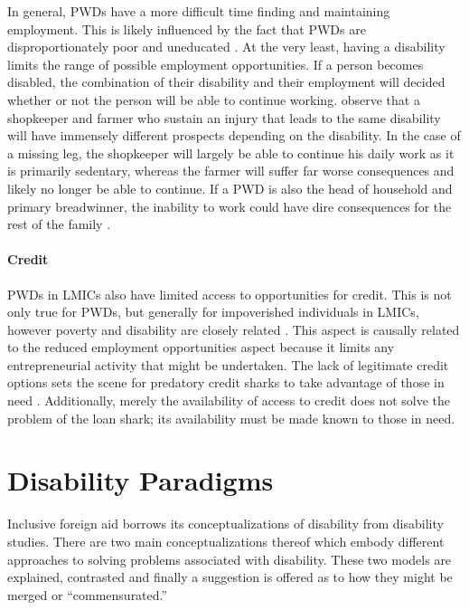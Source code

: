 \documentclass[a4paper]{article}
\begin{document}
In general, PWDs have a more difficult time finding and maintaining
employment. This is likely influenced by the fact that PWDs are
disproportionately poor and uneducated \citep{lamichhane2014nexus}. At the
very least, having a disability limits the range of possible employment
opportunities. If a person becomes disabled, the combination of their
disability and their employment will decided whether or not the person will be
able to continue working. \cite{chowdhury2006economics} observe that a
shopkeeper and farmer who sustain an injury that leads to the same disability
will have immensely different prospects depending on the disability. In the
case of a missing leg, the shopkeeper will largely be able to continue his
daily work as it is primarily sedentary, whereas the farmer will suffer far
worse consequences and likely no longer be able to continue. If a PWD is also
the head of household and primary breadwinner, the inability to work could
have dire consequences for the rest of the family \citep{world2011world}.

\paragraph{Credit}

PWDs in LMICs also have limited access to opportunities for credit. This is
not only true for PWDs, but generally for impoverished individuals in LMICs,
however poverty and disability are closely related
\citep{palmer2011disability}. This aspect is causally related to the reduced
employment opportunities aspect because it limits any entrepreneurial activity
that might be undertaken. The lack of legitimate credit options sets the scene
for predatory credit sharks to take advantage of those in need
\citep{beisland2017exploring}. Additionally, merely the availability of access
to credit does not solve the problem of the loan shark; its availability must
be made known to those in need.

\newpage
\section{Disability Paradigms}

Inclusive foreign aid borrows its conceptualizations of disability from
disability studies. There are two main conceptualizations thereof which embody
different approaches to solving problems associated with disability. These two
models are explained, contrasted and finally a suggestion is offered as to how
they might be merged or ``commensurated.''
\end{document}
